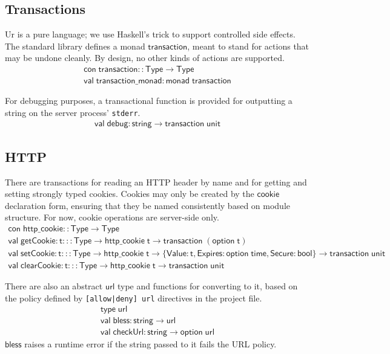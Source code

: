 \documentclass{article}
\newcommand{\mt}[1]{\mathsf{#1}}
\begin{document}
\subsection{Transactions}

Ur is a pure language; we use Haskell's trick to support controlled side effects.  The standard library defines a monad $\mt{transaction}$, meant to stand for actions that may be undone cleanly.  By design, no other kinds of actions are supported.
$$\begin{array}{l}
  \mt{con} \; \mt{transaction} :: \mt{Type} \to \mt{Type} \\
  \mt{val} \; \mt{transaction\_monad} : \mt{monad} \; \mt{transaction}
\end{array}$$

For debugging purposes, a transactional function is provided for outputting a string on the server process' \texttt{stderr}.
$$\begin{array}{l}
  \mt{val} \; \mt{debug} : \mt{string} \to \mt{transaction} \; \mt{unit}
\end{array}$$

\subsection{HTTP}

There are transactions for reading an HTTP header by name and for getting and setting strongly typed cookies.  Cookies may only be created by the $\mt{cookie}$ declaration form, ensuring that they be named consistently based on module structure.  For now, cookie operations are server-side only.
$$\begin{array}{l}
  \mt{con} \; \mt{http\_cookie} :: \mt{Type} \to \mt{Type} \\
  \mt{val} \; \mt{getCookie} : \mt{t} ::: \mt{Type} \to \mt{http\_cookie} \; \mt{t} \to \mt{transaction} \; (\mt{option} \; \mt{t}) \\
  \mt{val} \; \mt{setCookie} : \mt{t} ::: \mt{Type} \to \mt{http\_cookie} \; \mt{t} \to \{\mt{Value} : \mt{t}, \mt{Expires} : \mt{option} \; \mt{time}, \mt{Secure} : \mt{bool}\} \to \mt{transaction} \; \mt{unit} \\
  \mt{val} \; \mt{clearCookie} : \mt{t} ::: \mt{Type} \to \mt{http\_cookie} \; \mt{t} \to \mt{transaction} \; \mt{unit}
\end{array}$$

There are also an abstract $\mt{url}$ type and functions for converting to it, based on the policy defined by \texttt{[allow|deny] url} directives in the project file.
$$\begin{array}{l}
  \mt{type} \; \mt{url} \\
  \mt{val} \; \mt{bless} : \mt{string} \to \mt{url} \\
  \mt{val} \; \mt{checkUrl} : \mt{string} \to \mt{option} \; \mt{url}
\end{array}$$
$\mt{bless}$ raises a runtime error if the string passed to it fails the URL policy.
\end{document}
